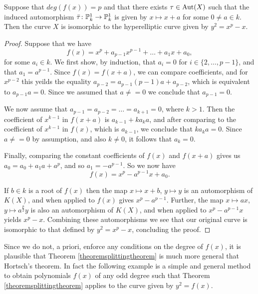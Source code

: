     \begin{lem}
    Suppose that $deg(f(x)) = p$ and that there exists $\tau \in \operatorname{Aut}(X)$ such that the induced automorphism $\bar \tau \colon {\mathbb P}_k^1 \rightarrow {\mathbb P}_k^1$ is given by $x \mapsto x+a$ for some $0 \neq a \in k$.
    Then the curve $X$ is isomorphic to the hyperelliptic curve given by $y^2 = x^p - x$.
    \end{lem}
    \begin{proof}
    Suppose that we have
        \[
        f(x) = x^p + a_{p-1}x^{p-1} + \ldots + a_1x + a_0,
        \]
    for some $a_i \in k$.
    We first show, by induction, that $a_i = 0$ for $i \in \{2, \ldots, p-1\}$, and that $a_1 = a^{p-1}$.
    Since $f(x) = f(x+a)$, we can compare coefficients, and for $x^{p-2}$ this yeilds the equality $a_{p-2} = a_{p-1}(p-1)a + a_{p-2}$, which is equivalent to $a_{p-1}a = 0$.
    Since we assumed that $a \neq = 0$ we conclude that $a_{p-1} = 0$.

    We now assume that $a_{p-1} = a_{p-2} = \ldots = a_{k+1} = 0$, where $k >1$.
    Then the coefficient of $x^{k-1}$ in $f(x+a)$ is $a_{k-1} + ka_ka$, and after comparing to the coefficient of $x^{k-1}$ in $f(x)$, which is $a_{k-1}$, we conclude that $ka_ka = 0$.
    Since $a \neq =0$ by assumption, and also $k \neq 0$, it follows that $a_k = 0$.

    Finally, comparing the constant coefficients of $f(x)$ and $f(x+a)$ gives us $a_0 = a_0 + a_1a + a^p$, and so $a_1 = - a^{p-1}$.
    So we now have
        \[
        f(x) = x^p - a^{p-1}x + a_0.
        \]
    
    If $b \in k$ is a root of $f(x)$ then the map $x \mapsto x+b$, $y \mapsto y$ is an automorphism of $K(X)$, and when applied to $f(x)$ gives $x^p - a^{p-1}$.
    Further, the map $x \mapsto ax$, $y \mapsto a^{\frac{p}{2}}y$ is also an automorphism of $K(X)$, and when applied to $x^p - a^{p-1}x$ yields $x^p - x$.
    Combining these automorphisms we see that our original curve is isomorphic to that defined by $y^2 = x^p - x$, concluding the proof.
    \end{proof}

    Since we do not, a priori, enforce any conditions on the degree of $f(x)$, it is plausible that Theorem \ref{theoremsplittingtheorem} is much more general that Hortsch's theorem. In fact the following example is a simple and general method to obtain polynomials $f(x)$ of any odd degree such that Theorem \ref{theoremsplittingtheorem} applies to the curve given by $y^2 = f(x)$.


